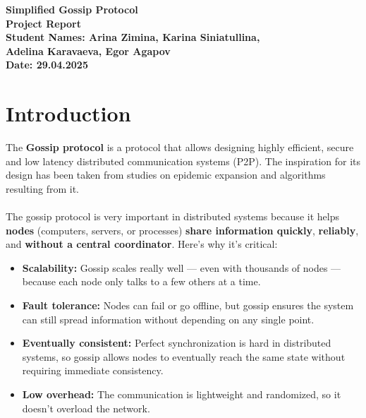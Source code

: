 \documentclass[a4paper,12pt]{article}
\begin{document}
\begin{titlepage}
    \centering
    {\Large \textbf{Simplified Gossip Protocol}}\\[1cm]
    \textbf{Project Report}\\[0.5cm]
    \vfill
    \textbf{Student Names: Arina Zimina, Karina Siniatullina,} \\[0.3cm]
    \textbf{Adelina Karavaeva, Egor Agapov} \\[0.5cm]
    \textbf{Date: 29.04.2025} \\[2cm]
    \vfill
\end{titlepage}

\section{Introduction}

The \textbf{Gossip protocol} is a protocol that allows designing highly efficient, secure and low latency distributed communication systems (P2P). The inspiration for its design has been taken from studies on epidemic expansion and algorithms resulting from it. \\\\
The gossip protocol is very important in distributed systems because it helps \textbf{nodes} (computers, servers, or processes) \textbf{share information quickly}, \textbf{reliably}, and \textbf{without a central coordinator}. Here's why it's critical:
\begin{itemize}
    \item \textbf{Scalability:} Gossip scales really well — even with thousands of nodes — because each node only talks to a few others at a time.
    \item \textbf{Fault tolerance:} Nodes can fail or go offline, but gossip ensures the system can still spread information without depending on any single point.
    \item \textbf{Eventually consistent:} Perfect synchronization is hard in distributed systems, so gossip allows nodes to eventually reach the same state without requiring immediate consistency.
    \item \textbf{Low overhead:} The communication is lightweight and randomized, so it doesn't overload the network.
\end{itemize}
\end{document}
